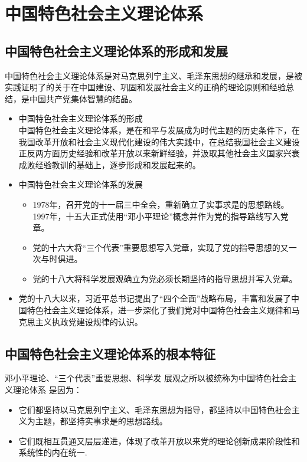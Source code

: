 \section{中国特色社会主义理论体系}
\subsection{中国特色社会主义理论体系的形成和发展}
中国特色社会主义理论体系是对马克思列宁主义、毛泽东思想的继承和发展，是被实践证明了的关于在中国建设、巩固和发展社会主义的正确的理论原则和经验总结，是中国共产党集体智慧的结晶。
\begin{itemize}
\item 中国特色社会主义理论体系的形成\\
中国特色社会主义理论体系，是在和平与发展成为时代主题的历史条件下，在我国改革开放和社会主义现代化建设的伟大实践中，在总结我国社会主义建设正反两方面历史经验和改革开放以来新鲜经验，并汲取其他社会主义国家兴衰成败经验教训的基础上，逐步形成和发展起来的。
\item 中国特色社会主义理论体系的发展
\begin{itemize}
	\item 1978年，召开党的十一届三中全会，重新确立了实事求是的思想路线。1997年，十五大正式使用“邓小平理论”概念并作为党的指导路线写入党章。
	\item 党的十六大将“三个代表”重要思想写入党章，实现了党的指导思想的又一次与时俱进。
	\item 党的十八大将科学发展观确立为党必须长期坚持的指导思想并写入党章。
\end{itemize}
\item 党的十八大以来，习近平总书记提出了“四个全面”战略布局，丰富和发展了中国特色社会主义理论体系，进一步深化了我们党对中国特色社会主义规律和马克思主义执政党建设规律的认识。
\end{itemize}
\subsection{中国特色社会主义理论体系的根本特征}
邓小平理论、“三个代表”重要思想、科学发
展观之所以被统称为中国特色社会主义理论体系
是因为：
\begin{itemize}
\item 它们都坚持以马克思列宁主义、毛泽东思想为指导，都坚持以中国特色社会主义为主题，都坚持实事求是的思想路线。
\item 它们既相互贯通又层层递进，体现了改革开放以来党的理论创新成果阶段性和系统性的内在统一.
\end{itemize}
